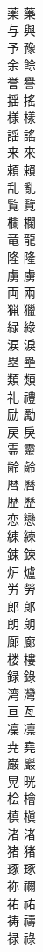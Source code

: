 \documentclass[8pt]{extreport}
\begin{document}
\begin{CJK}{UTF8}{min}
\\	薬	藥
\\	与	與
\\	予	豫
\\	余	餘
\\	誉	譽
\\	揺	搖
\\	様	樣
\\	謡	謠
\\	来	來
\\	頼	賴
\\	乱	亂
\\	覧	覽
\\	欄	欄
\\	竜	龍
\\	隆	隆
\\	虜	虜
\\	両	兩
\\	猟	獵
\\	緑	綠
\\	涙	淚
\\	塁	壘
\\	類	類
\\	礼	禮
\\	励	勵
\\	戻	戾
\\	霊	靈
\\	齢	齡
\\	暦	曆
\\	歴	歷
\\	恋	戀
\\	練	練
\\	錬	鍊
\\	炉	爐
\\	労	勞
\\	郎	郞
\\	朗	朗
\\	廊	廊
\\	楼	樓
\\	録	錄
\\	湾	灣
\\	亘	亙
\\	凜	凛
\\	尭	堯
\\	巌	巖
\\	晃	晄
\\	桧	檜
\\	槙	槇
\\	渚	渚
\\	猪	猪
\\	琢	琢
\\	祢	禰
\\	祐	祐
\\	祷	禱
\\	禄	祿

\end{CJK}
\end{document}
